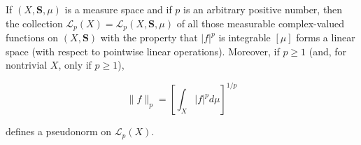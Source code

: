 If $(X, \mathbf{S}, \mu)$ is a measure space and if $p$ is an arbitrary positive number, then the collection $\mathcal{L}_p(X) = \mathcal{L}_p(X, \mathbf{S}, \mu)$ of all those measurable complex-valued functions on $(X, \mathbf{S})$ with the property that $|f|^p$ is integrable $[\mu]$ forms a linear space (with respect to pointwise linear operations). Moreover, if $p \geq 1$ (and, for nontrivial $X$, only if $p \geq 1$),

$$\|f\|_p = \left[ \int_X |f|^p d\mu \right]^{1/p}$$

defines a pseudonorm on $\mathcal{L}_p(X)$.

